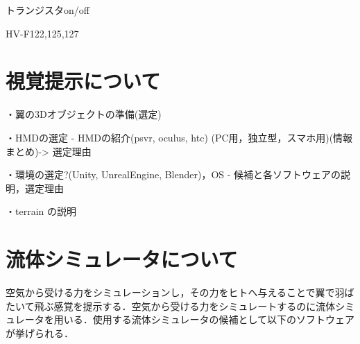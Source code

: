     トランジスタon/off

    HV-F122,125,127



    


\section{視覚提示について}
    ・翼の3Dオブジェクトの準備(選定)

    ・HMDの選定
        - HMDの紹介(psvr, oculus, htc) (PC用，独立型，スマホ用)(情報まとめ)-> 選定理由

    ・環境の選定?(Unity, UnrealEngine, Blender)，OS
        - 候補と各ソフトウェアの説明，選定理由

    ・terrain の説明



\section{流体シミュレータについて} 
    空気から受ける力をシミュレーションし，その力をヒトへ与えることで翼で羽ばたいて飛ぶ感覚を提示する．空気から受ける力をシミュレートするのに流体シミュレータを用いる．使用する流体シミュレータの候補として以下のソフトウェアが挙げられる．

